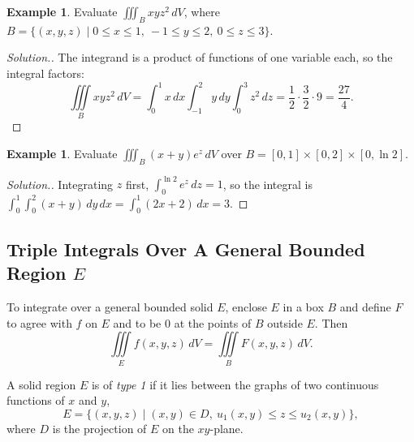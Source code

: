 \documentclass[11pt,a4paper]{article}
\theoremstyle{definition}
\newtheorem{exa}[thm]{Example}
\newenvironment{solution}
  {\renewcommand{\qedsymbol}{}\begin{proof}[\textit{Solution}.]}
  {\end{proof}}
\begin{document}
\begin{exa}
\label{ex:triplebox}
Evaluate $\iiint_B xyz^2\, dV$, where
$B = \{ (x,y,z) \mid 0\leq x\leq 1,\ -1 \leq y \leq 2,\ 0\leq z\leq 3\}$.
\end{exa}

\begin{solution}
The integrand is a product of functions of one variable each, so the integral
factors:
\[\iiint\limits_B xyz^2\, dV = \int^1_0 x\,dx\int^2_{-1}y\,dy\int^3_0 z^2\,dz =
\frac12\cdot\frac32\cdot 9 = \frac{27}{4} .\]
\end{solution}

\begin{exa}
\label{ex:tripleboxexp}
Evaluate $\iiint_B (x + y)e^{z}\,dV$ over $B = [0,1]\times[0,2]\times[0,\ln 2]$.
\end{exa}

\begin{solution}
Integrating $z$ first, $\int_0^{\ln 2}e^z\,dz = 1$, so the integral is
$\int_0^1\int_0^2 (x + y)\,dy\,dx = \int_0^1 (2x + 2)\,dx = 3$.
\end{solution}

{\color[wave]{485}\subsection{Triple Integrals Over A General Bounded Region $E$}}

To integrate over a general bounded solid $E$, enclose $E$ in a box $B$ and
define $F$ to agree with $f$ on $E$ and to be $0$ at the points of $B$ outside
$E$. Then
\[\iiint\limits_E f(x,y,z)\, dV = \iiint\limits_B F(x,y,z)\,dV .\]

A solid region $E$ is of \emph{type 1} if it lies between the graphs of two
continuous functions of $x$ and $y$,
\[E = \{ (x,y,z) \mid (x,y) \in D,\ u_1(x,y) \leq z \leq u_2(x,y)\},\]
where $D$ is the projection of $E$ on the $xy$-plane.
\end{document}
